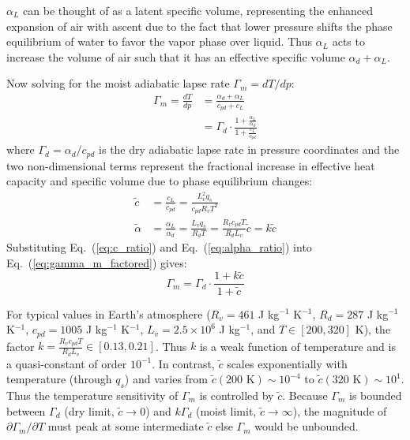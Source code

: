 \documentclass[draft]{ametsocV6.1}
\begin{document}
$\alpha_L$ can be thought of as a latent specific volume, representing the enhanced expansion of air with ascent due to the fact that lower pressure shifts the phase equilibrium of water to favor the vapor phase over liquid. Thus $\alpha_L$ acts to increase the volume of air such that it has an effective specific volume $\alpha_d + \alpha_L$.

Now solving for the moist adiabatic lapse rate $\Gamma_m = dT/dp$:
\begin{align}
\Gamma_m = \frac{dT}{dp} &= \frac{\alpha_d +\alpha_L}{c_{pd} + c_L} \label{eq:gamma_m_ratio} \\
&= \Gamma_d \cdot \frac{1+\frac{\alpha_L}{\alpha_d}}{1+\frac{c_L}{c_{pd}}} \label{eq:gamma_m_factored}
\end{align}
where $\Gamma_d = \alpha_d / c_{pd}$ is the dry adiabatic lapse rate in pressure coordinates and the two non-dimensional terms represent the fractional increase in effective heat capacity and specific volume due to phase equilibrium changes:
\begin{align}
\tilde{c} &= \frac{c_L}{c_{pd}} = \frac{L_v^2 q_s}{c_{pd} R_v T^2} \label{eq:c_ratio} \\
\tilde{\alpha} &= \frac{\alpha_L}{\alpha_d} = \frac{L_v q_s}{R_d T} = \frac{R_v c_{pd}T}{R_dL_v}\tilde{c} = k\tilde{c} \label{eq:alpha_ratio}
\end{align}
Substituting Eq.~(\ref{eq:c_ratio}) and Eq.~(\ref{eq:alpha_ratio}) into Eq.~(\ref{eq:gamma_m_factored}) gives:
\begin{equation}
\Gamma_m = \Gamma_d \cdot \frac{1 + k\tilde{c}}{1 + \tilde{c}} \label{eq:gamma_m_tilde}
\end{equation}

For typical values in Earth's atmosphere ($R_v=461$ J kg$^{-1}$ K$^{-1}$, $R_d=287$ J kg$^{-1}$ K$^{-1}$, $c_{pd}=1005$ J kg$^{-1}$ K$^{-1}$, $L_v=2.5\times10^6$ J kg$^{-1}$, and $T \in [200, 320]$ K), the factor $k=\frac{R_v c_{pd}T}{R_dL_v}\in [0.13, 0.21]$. Thus $k$ is a weak function of temperature and is a quasi-constant of order $10^{-1}$. In contrast, $\tilde{c}$ scales exponentially with temperature (through $q_s$) and varies from $\tilde{c}(200\text{ K})\sim 10^{-4}$ to $\tilde{c}(320\text{ K})\sim 10^{1}$. Thus the temperature sensitivity of $\Gamma_m$ is controlled by $\tilde{c}$. Because $\Gamma_m$ is bounded between $\Gamma_d$ (dry limit, $\tilde{c} \to 0$) and $k\Gamma_d$ (moist limit, $\tilde{c} \to \infty$), the magnitude of $\partial\Gamma_m/\partial T$ must peak at some intermediate $\tilde{c}$ else $\Gamma_m$ would be unbounded.
\end{document}

